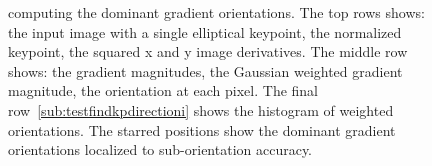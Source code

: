 {\begin{figure}[ht!]
{  computing the dominant gradient orientations.
The top rows shows:
 the input image with a single
  elliptical keypoint,  the normalized
  keypoint,  the
  squared x and y image derivatives.
The middle row shows:
 the gradient magnitudes,
   the Gaussian weighted gradient
  magnitude,
 the
  orientation at each pixel.
The final row~\cref{sub:testfindkpdirectioni} shows the histogram of
  weighted orientations.
The starred positions show the dominant gradient orientations localized
  to sub-orientation accuracy.
}
\label{fig:testfindkpdirection}
\end{figure}
}







\begin{comment}
python -m plottool.viz_featrow --test-draw_feat_row --dpath ~/latex/cand/ --save figures2/viz_featrow.jpg --figsize=12,6 --dpi 180 --clipwhite --diskshow --fname zebra.png --fx=121  --saveparts
\end{comment}



